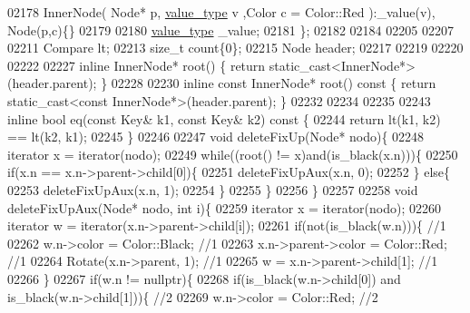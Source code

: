 \begin{DoxyCode}
02178        InnerNode( Node* p, \hyperlink{classaed2_1_1map_a719db98e0ff9a837610f76be33264680_a719db98e0ff9a837610f76be33264680}{value\_type} v ,Color c = Color::Red ):\_value(v), Node(p,c)\{\}
02179         
02180         \hyperlink{classaed2_1_1map_a719db98e0ff9a837610f76be33264680_a719db98e0ff9a837610f76be33264680}{value\_type} \_value;
02181     \};
02182 
02184 
02205 
02207 
02211     Compare lt;
02213     \textcolor{keywordtype}{size\_t} count\{0\};
02215     Node header;
02217 
02219 
02220 
02222 
02227     \textcolor{keyword}{inline} InnerNode* root() \{ \textcolor{keywordflow}{return} \textcolor{keyword}{static\_cast<}InnerNode*\textcolor{keyword}{>}(header.parent); \}
02228 
02230     \textcolor{keyword}{inline} \textcolor{keyword}{const} InnerNode* root()\textcolor{keyword}{ const }\{ \textcolor{keywordflow}{return} \textcolor{keyword}{static\_cast<}\textcolor{keyword}{const }InnerNode*\textcolor{keyword}{>}(header.parent); \}
02232 
02234 
02235 
02243     \textcolor{keyword}{inline} \textcolor{keywordtype}{bool} eq(\textcolor{keyword}{const} Key& k1, \textcolor{keyword}{const} Key& k2)\textcolor{keyword}{ const }\{
02244         \textcolor{keywordflow}{return} lt(k1, k2) == lt(k2, k1);
02245     \}
02246 
02247     \textcolor{keywordtype}{void} deleteFixUp(Node* nodo)\{
02248         iterator x = iterator(nodo);
02249         \textcolor{keywordflow}{while}((root() != x)and(is\_black(x.n)))\{
02250             \textcolor{keywordflow}{if}(x.n == x.n->parent->child[0])\{
02251                 deleteFixUpAux(x.n, 0);
02252             \} \textcolor{keywordflow}{else}\{
02253                 deleteFixUpAux(x.n, 1);
02254             \}
02255         \}
02256     \}
02257 
02258     \textcolor{keywordtype}{void} deleteFixUpAux(Node* nodo, \textcolor{keywordtype}{int} i)\{
02259         iterator x = iterator(nodo);
02260         iterator w = iterator(x.n->parent->child[i]);
02261         \textcolor{keywordflow}{if}(not(is\_black(w.n)))\{                     \textcolor{comment}{//1}
02262             w.n->color = Color::Black;              \textcolor{comment}{//1}
02263             x.n->parent->color = Color::Red;        \textcolor{comment}{//1}
02264             Rotate(x.n->parent, 1);                 \textcolor{comment}{//1}
02265             w = x.n->parent->child[1];              \textcolor{comment}{//1}
02266         \}
02267         \textcolor{keywordflow}{if}(w.n != \textcolor{keyword}{nullptr})\{
02268             \textcolor{keywordflow}{if}(is\_black(w.n->child[0]) and is\_black(w.n->child[1]))\{    \textcolor{comment}{//2}
02269                 w.n->color = Color::Red;                                \textcolor{comment}{//2}

\end{DoxyCode}
